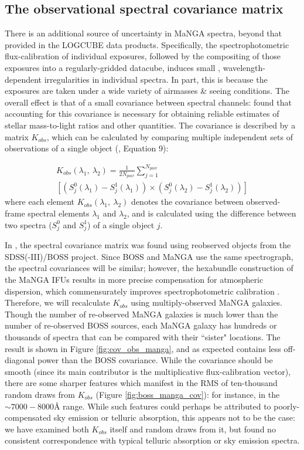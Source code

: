 \subsection{The observational spectral covariance matrix}
\label{chap1:subsec:cov}

There is an additional source of uncertainty in MaNGA spectra, beyond that provided in the LOGCUBE data products. Specifically, the spectrophotometric flux-calibration of individual exposures, followed by the compositing of those exposures into a regularly-gridded datacube, induces small \citep[$\sim 4\%$, according to][]{manga_drp}, wavelength-dependent irregularities in individual spectra. In part, this is because the exposures are taken under a wide variety of airmasses \& seeing conditions. The overall effect is that of a small covariance between spectral channels:  found that accounting for this covariance is necessary for obtaining reliable estimates of stellar mass-to-light ratios and other quantities. The covariance is described by a matrix $K_{obs}$, which can be calculated by comparing multiple independent sets of observations of a single object (, Equation 9):

\begin{eqnarray}
    K_{obs}(\lambda_1,~\lambda_2) = \frac{1}{2 N_{pair}} \sum_{j=1}^{N_{pair}} \nonumber \\ \left[ (S_j^0(\lambda_1) - S_j^1(\lambda_1)) \times (S_j^0(\lambda_2) - S_j^1(\lambda_2)) \right]
\end{eqnarray}
%
where each element $K_{obs}(\lambda_1,~\lambda_2)$ denotes the covariance between observed-frame spectral elements $\lambda_1$ and $\lambda_2$, and is calculated using the difference between two spectra ($S_j^0$ and $S_j^1$) of a single object $j$.

In , the spectral covariance matrix was found using reobserved objects from the SDSS(-III)/BOSS project. Since BOSS and MaNGA use the same spectrograph, the spectral covariances will be similar; however, the hexabundle construction of the MaNGA IFUs results in more precise compensation for atmospheric dispersion, which commensurately improves spectrophotometric calibration \citep{manga_spectrophot}. Therefore, we will recalculate $K_{obs}$ using multiply-observed MaNGA galaxies. Though the number of re-observed MaNGA galaxies is much lower than the number of re-observed BOSS sources, each MaNGA galaxy has hundreds or thousands of spectra that can be compared with their ``sister" locations. The result is shown in Figure \ref{fig:cov_obs_manga}, and as expected contains less off-diagonal power than the BOSS covariance. While the covariance should be smooth (since its main contributor is the multiplicative flux-calibration vector), there are some sharper features which manifest in the RMS of ten-thousand random draws from $K_{obs}$ (Figure \ref{fig:boss_manga_cov}): for instance, in the $\sim 7000-8000 \mbox{\AA}$ range. While such features could perhaps be attributed to poorly-compensated sky emission or telluric absorption, this appears not to be the case: we have examined both $K_{obs}$ itself and random draws from it, but found no consistent correspondence with typical telluric absorption or sky emission spectra.

